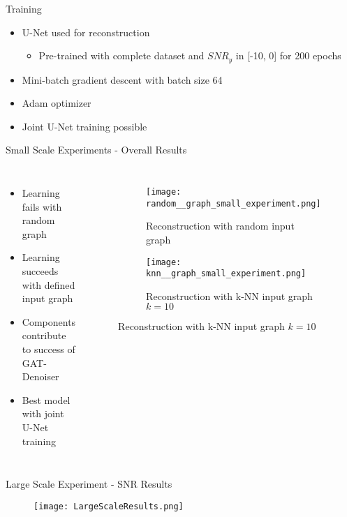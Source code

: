 \begin{frame}{Training}
    \begin{itemize}
        \item U-Net used for reconstruction
        \begin{itemize}
            \item Pre-trained with complete dataset and $SNR_y$ in [-10, 0] for 200 epochs
        \end{itemize}
        \item Mini-batch gradient descent with batch size 64
        \item Adam optimizer
        \item Joint U-Net training possible
    \end{itemize}
\end{frame}

\begin{frame}{Small Scale Experiments - Overall Results}
    \begin{columns}
        \begin{itemize}
            \item Learning fails with random graph
            \item Learning succeeds with defined input graph
            \item<2-> Components contribute to success of GAT-Denoiser
            \item<2-> Best model with joint U-Net training 
        \end{itemize}
        \begin{figure}
          \centering
          \begin{subfigure}[t]{0.4\textwidth}
              \texttt{[image: random\_\_graph\_small\_experiment.png]}
              \caption{Reconstruction with random input graph}
          \end{subfigure}\hfill
          \begin{subfigure}[t]{0.4\textwidth}
              \texttt{[image: knn\_\_graph\_small\_experiment.png]}
              \caption{Reconstruction with k-NN input graph $k = 10$}
          \end{subfigure}
      \end{figure}
        
    \end{columns}
\end{frame}

\begin{frame}{Large Scale Experiment - SNR Results}
    \begin{figure}
        \centering
        \texttt{[image: LargeScaleResults.png]}
    \end{figure}
\end{frame}


